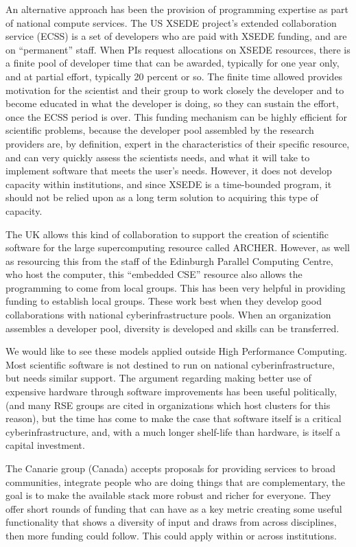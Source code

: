 An alternative approach has been the provision of programming expertise as
part of national compute services. The US XSEDE project's extended collaboration
service (ECSS) is a set of developers who are paid with XSEDE funding, and are on 
“permanent” staff.  When PIs request allocations on XSEDE resources, there is a 
finite pool of developer time that can be awarded, typically for one year only, 
and at partial effort, typically 20 percent or so. The finite time allowed provides
motivation for the scientist and their group to work closely the developer and to 
become educated in what the developer is doing, so they can sustain the effort, once 
the ECSS period is over. This funding mechanism can be highly efficient for scientific
problems, because the developer pool assembled by the research providers are, by definition, 
expert in the characteristics of their specific resource, and can very quickly assess the
scientists needs, and what it will take to implement software that meets the user’s needs. 
However, it does not develop capacity within institutions, and since XSEDE is a time-bounded
program, it should not be relied upon as a long term solution to acquiring this type of capacity.

The UK allows this kind of collaboration to support the creation of scientific
software for the large supercomputing resource called ARCHER.
However, as well as resourcing this from the staff of the Edinburgh Parallel
Computing Centre, who host the computer, this ``embedded CSE'' resource also
allows the programming to come from local groups. This has been very helpful
in providing funding to establish local groups. These work best when they
develop good collaborations with national cyberinfrastructure pools.
When an organization assembles a developer pool, diversity is developed and 
skills can be transferred.

We would like to see these models applied outside High Performance Computing.
Most scientific software is not destined to run on national cyberinfrastructure,
but needs similar support. The argument regarding making better use of expensive
hardware through software improvements has been useful politically, (and many
RSE groups are cited in organizations which host clusters for this reason), but
the time has come to make the case that software itself is a critical
cyberinfrastructure, and, with a much longer shelf-life than hardware, is itself
a capital investment.

The Canarie group (Canada) accepts proposals for providing services to broad communities, 
integrate people who are doing things that are complementary, the goal is to make the available 
stack more robust and richer for everyone. They offer short rounds of funding that can
have as a key metric creating some useful functionality that shows a diversity
of input and draws from across disciplines, then more funding could follow. This
could apply within or across institutions.

